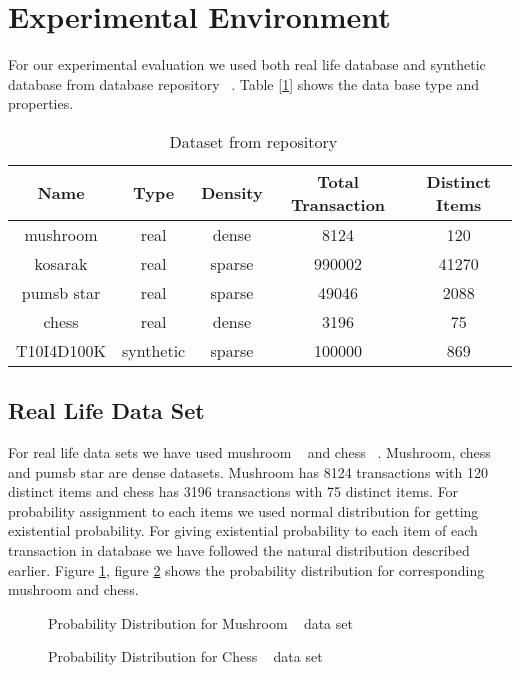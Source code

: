 \section{Experimental Environment}
For our experimental evaluation we used both real life database and synthetic database from database repository ~\cite{dataset}. Table [\ref{table:dataset}] shows the data base type and properties.
		\begin{table}[h]
		\centering
		\begin{tabular}{|c|c|c|c|c|}
		\hline 
		Name		&	Type	&	Density	&	Total Transaction 	&	Distinct Items	\\ \hline \hline
		mushroom	&	real	&	dense	&	8124	&	120							\\ \hline
		kosarak		&	real	&	sparse	&	990002	&	41270						\\ \hline
		pumsb star	&	real	&	sparse	&	49046	&	2088						\\ \hline
		chess		&	real	&	dense	&	3196	&	75							\\ \hline
		T10I4D100K	&	synthetic	&	sparse	&	100000	&	869						\\ \hline
			\end{tabular}
		\caption{Dataset from repository ~\cite{dataset}}
		\label{table:dataset}
		\end{table}


\subsection{Real Life Data Set}
For real life data sets we have used mushroom ~\cite{dataset} and chess ~\cite{dataset}. Mushroom, chess and pumsb star are dense datasets. Mushroom has 8124 transactions with 120 distinct items and chess has 3196 transactions with 75 distinct items. For probability assignment to each items we used normal distribution for getting existential probability. For giving existential probability to each item of each transaction in database we have followed the natural distribution described earlier. Figure \ref{result:g_dataset_mushroom}, figure \ref{result:g_dataset_chess} shows the probability distribution for corresponding mushroom and chess.
		\begin{figure}[h]
		\centering
			
		\caption{Probability Distribution for Mushroom ~\cite{dataset} data set}
		\label{result:g_dataset_mushroom}
		\end{figure}
		
		\begin{figure}[h]
		\centering
			
		\caption{Probability Distribution for Chess ~\cite{dataset} data set}
		\label{result:g_dataset_chess}
		\end{figure}

